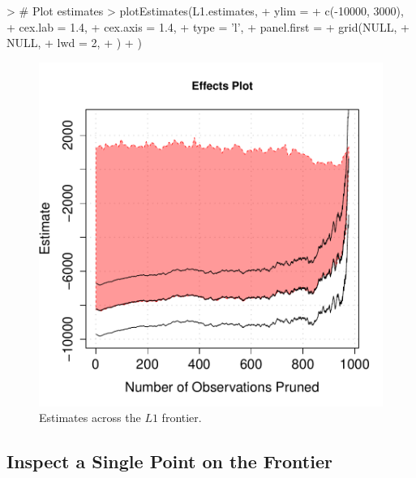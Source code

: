 \documentclass[nojss]{jss}
\begin{document}
\begin{minipage}{0.45\textwidth}
\begin{Schunk}
\begin{Sinput}
> # Plot estimates
> plotEstimates(L1.estimates, 
+               ylim = 
+                   c(-10000, 3000),
+               cex.lab = 1.4,
+               cex.axis = 1.4,
+               type = 'l',
+               panel.first = 
+                  grid(NULL,
+                       NULL,
+                       lwd = 2,
+                       )
+               )
\end{Sinput}
\end{Schunk}
\end{minipage}
\begin{minipage}{0.5\textwidth}
\begin{figure}[H]
\includegraphics{Using_MatchingFrontier-mahal_frontier_est.pdf}
\caption{\label{fig:mahal_frontier_est} Estimates across the $L1$ frontier.}
\end{figure}
\end{minipage} \hfill

\subsection{Inspect a Single Point on the Frontier}
\end{document}

